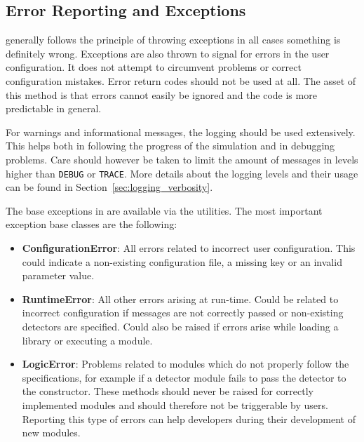 \subsection{Error Reporting and Exceptions}
\label{sec:error_reporting_exceptions}
\apsq generally follows the principle of throwing exceptions in all cases something is definitely wrong.
Exceptions are also thrown to signal for errors in the user configuration.
It does not attempt to circumvent problems or correct configuration mistakes.
Error return codes should not be used at all.
The asset of this method is that errors cannot easily be ignored and the code is more predictable in general.

For warnings and informational messages, the logging should be used extensively.
This helps both in following the progress of the simulation and in debugging problems.
Care should however be taken to limit the amount of messages in levels higher than \texttt{DEBUG} or \texttt{TRACE}.
More details about the logging levels and their usage can be found in Section~\ref{sec:logging_verbosity}.

The base exceptions in \apsq are available via the utilities.
The most important exception base classes are the following:
\begin{itemize}
\item \textbf{ConfigurationError}: All errors related to incorrect user configuration.
This could indicate a non-existing configuration file, a missing key or an invalid parameter value.
\item \textbf{RuntimeError}: All other errors arising at run-time.
Could be related to incorrect configuration if messages are not correctly passed or non-existing detectors are specified.
Could also be raised if errors arise while loading a library or executing a module.
\item \textbf{LogicError}: Problems related to modules which do not properly follow the specifications, for example if a detector module fails to pass the detector to the constructor.
These methods should never be raised for correctly implemented modules and should therefore not be triggerable by users.
Reporting this type of errors can help developers during their development of new modules.
\end{itemize}

